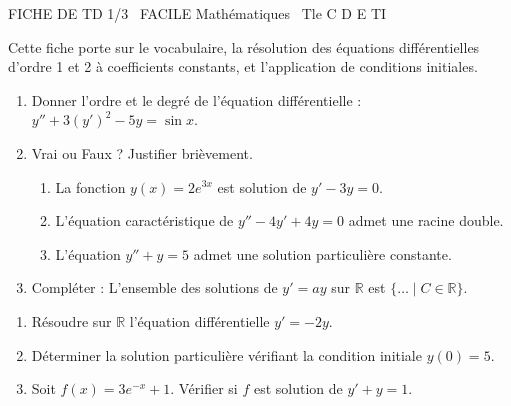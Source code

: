 \documentclass[11pt]{article}
\begin{document}
\begin{tcolorbox}[enhanced,colback=popink,colframe=popink,arc=10pt,boxrule=0pt,left=12pt,right=12pt,top=9pt,bottom=9pt]
{\color{white}\popxbold\small FICHE DE TD 1/3 \textbullet\ FACILE \hfill Mathématiques \textbullet\ Tle C D E TI\par}
\end{tcolorbox}
\vspace{4pt}
Cette fiche porte sur le vocabulaire, la résolution des équations différentielles d'ordre 1 et 2 à coefficients constants, et l'application de conditions initiales.

\begin{exercice}
\begin{enumerate}
    \item Donner l'ordre et le degré de l'équation différentielle : $y'' + 3(y')^2 - 5y = \sin x$.
    \item Vrai ou Faux ? Justifier brièvement.
    \begin{enumerate}
        \item La fonction $y(x) = 2e^{3x}$ est solution de $y' - 3y = 0$.
        \item L'équation caractéristique de $y'' - 4y' + 4y = 0$ admet une racine double.
        \item L'équation $y'' + y = 5$ admet une solution particulière constante.
    \end{enumerate}
    \item Compléter : L'ensemble des solutions de $y' = ay$ sur $\mathbb{R}$ est $\{\dots \mid C \in \mathbb{R}\}$.
\end{enumerate}
\end{exercice}

\begin{exercice}[Équation du premier ordre : $y' = ay$]
\begin{enumerate}
    \item Résoudre sur $\mathbb{R}$ l'équation différentielle $y' = -2y$.
    \item Déterminer la solution particulière vérifiant la condition initiale $y(0) = 5$.
    \item Soit $f(x) = 3e^{-x} + 1$. Vérifier si $f$ est solution de $y' + y = 1$.
\end{enumerate}
\end{exercice}
\end{document}
